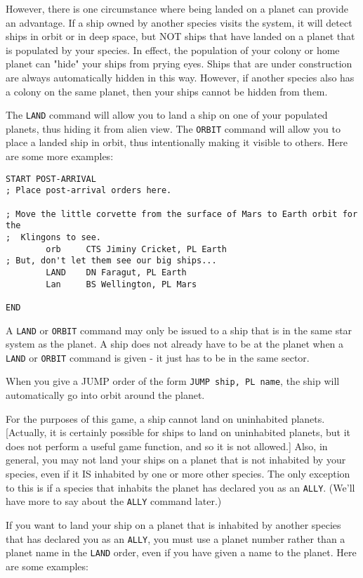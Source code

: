 \documentclass[10pt,titlepage]{article}
\begin{document}
However, there is one circumstance where being landed on a planet can provide
an advantage.  If a ship owned by another species visits the system, it will
detect ships in orbit or in deep space, but NOT ships that have landed on a
planet that is populated by your species.  In effect, the population of your
colony or home planet can "hide" your ships from prying eyes.  Ships that are
under construction are always automatically hidden in this way.  However, if
another species also has a colony on the same planet, then your ships cannot be
hidden from them.

The \texttt{LAND} command will allow you to land a ship on one of your populated
planets, thus hiding it from alien view.  The \texttt{ORBIT} command will allow you to
place a landed ship in orbit, thus intentionally making it visible to others.
Here are some more examples:

\begin{verbatim}
START POST-ARRIVAL
; Place post-arrival orders here.

; Move the little corvette from the surface of Mars to Earth orbit for the
;  Klingons to see.
        orb     CTS Jiminy Cricket, PL Earth
; But, don't let them see our big ships...
        LAND    DN Faragut, PL Earth
        Lan     BS Wellington, PL Mars

END
\end{verbatim} 

A \texttt{LAND} or \texttt{ORBIT} command may only be issued to a ship that is in the same star
system as the planet.  A ship does not already have to be at the planet when a
\texttt{LAND} or \texttt{ORBIT} command is given - it just has to be in the same sector.
  
When you give a JUMP order of the form \texttt{JUMP ship, PL name}, the ship will
automatically go into orbit around the planet.

For the purposes of this game, a ship cannot land on uninhabited planets.
[Actually, it is certainly possible for ships to land on uninhabited planets,
but it does not perform a useful game function, and so it is not allowed.]
Also, in general, you may not land your ships on a planet that is not inhabited
by your species, even if it IS inhabited by one or more other species.  The
only exception to this is if a species that inhabits the planet has declared
you as an \texttt{ALLY}.  (We'll have more to say about the \texttt{ALLY} command later.)

If you want to land your ship on a planet that is inhabited by another species
that has declared you as an \texttt{ALLY}, you must use a planet number rather than a
planet name in the \texttt{LAND} order, even if you have given a name to the planet.
Here are some examples:
\end{document}
